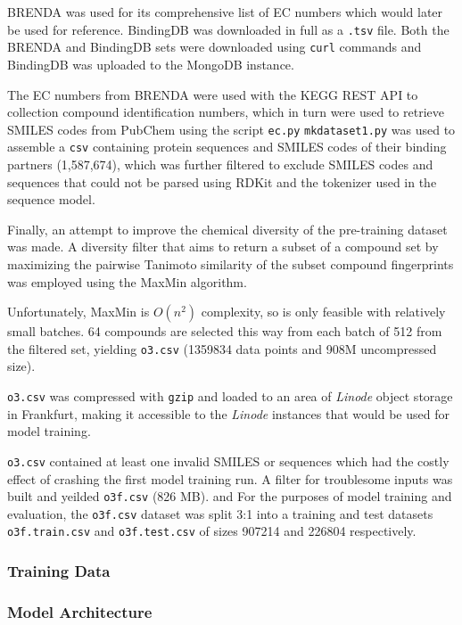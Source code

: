 \documentclass[16pt]{book}
\begin{document}
BRENDA was used for its comprehensive list of EC numbers which would later be used for reference.
BindingDB was downloaded in full as a \texttt{.tsv} file.
Both the BRENDA and BindingDB sets were downloaded using \texttt{curl} commands and BindingDB was uploaded to the MongoDB instance.

The EC numbers from BRENDA were used with the KEGG REST API to collection compound identification numbers, which in turn were used to retrieve SMILES codes from PubChem using the script \texttt{ec.py}
\texttt{mkdataset1.py} was used to assemble a \texttt{csv} containing protein sequences and SMILES codes of their binding partners (1,587,674), which was further filtered to exclude SMILES codes and sequences that could not be parsed using RDKit and the tokenizer used in the sequence model.

Finally, an attempt to improve the chemical diversity of the pre-training dataset was made.
A diversity filter that aims to return a subset of a compound set by maximizing the pairwise Tanimoto similarity of the subset compound fingerprints was employed using the MaxMin algorithm.


Unfortunately, MaxMin is $O(n^2)$ complexity, so is only feasible with relatively small batches.
64 compounds are selected this way from each batch of 512 from the filtered set, yielding \texttt{o3.csv} (1359834 data points and 908M uncompressed size).

\texttt{o3.csv} was compressed with \texttt{gzip} and loaded to an area of \textit{Linode} object storage in Frankfurt, making it accessible to the \textit{Linode} instances that would be used for model training.

\texttt{o3.csv} contained at least one invalid SMILES or sequences which had the costly effect of crashing the first model training run.
A filter for troublesome inputs was built and yeilded \texttt{o3f.csv} (826 MB).
and
For the purposes of model training and evaluation, the \texttt{o3f.csv} dataset was split 3:1 into a training and test datasets  \texttt{o3f.train.csv} and \texttt{o3f.test.csv} of sizes 907214 and 226804 respectively.


\subsubsection{Training Data}

\subsubsection{Model Architecture}
\end{document}
